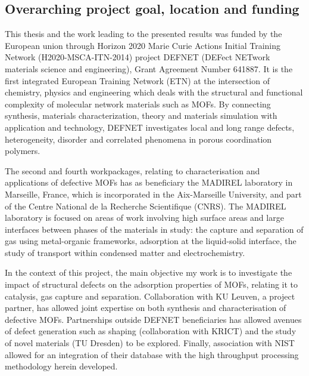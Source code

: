 \subsection*{Overarching project goal, location and funding}

This thesis and the work leading to the presented results 
was funded by the European union through Horizon 2020 Marie Curie
Actions Initial Training Network (H2020-MSCA-ITN-2014)
project DEFNET (DEFect NETwork materials science and engineering), 
Grant Agreement Number 641887. It is the first integrated 
European Training Network (ETN) at the intersection
of chemistry, physics and engineering which deals with the structural and
functional complexity of molecular network materials such as \glspl{MOF}. 
By connecting synthesis, materials characterization,
theory and materials simulation with application and technology, 
DEFNET investigates local and long range defects, heterogeneity, 
disorder and correlated phenomena in porous coordination polymers.

The second and fourth workpackages, relating to characterisation and
applications of defective \glspl{MOF} has as beneficiary the MADIREL 
laboratory in Marseille, France, which is incorporated in the
Aix-Marseille University, and part of the Centre
National de la Recherche Scientifique (CNRS). The MADIREL 
laboratory is focused on areas of work involving high surface
areas and large interfaces between phases of the materials in 
study: the capture and separation of gas using metal-organic 
frameworks, adsorption at the liquid-solid interface,
the study of transport within condensed matter and electrochemistry.

In the context of this project, the main objective my work is to
investigate the impact of structural defects on the adsorption
properties of \glspl{MOF}, relating it to catalysis, gas capture
and separation. Collaboration with KU Leuven, a project partner,
has allowed joint expertise on both synthesis and characterisation
of defective \glspl{MOF}. Partnerships outside DEFNET beneficiaries has
allowed avenues of defect generation such as shaping
(collaboration with KRICT) and the study of novel materials 
(TU Dresden) to be explored. Finally, association with NIST allowed 
for an integration of their database with the high throughput 
processing methodology herein developed.

\pagebreak


